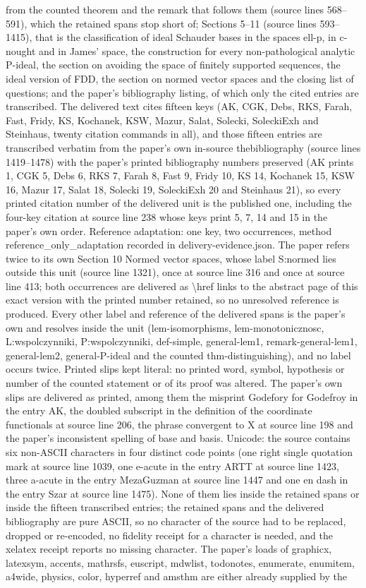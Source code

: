 \documentclass[10pt,a4paper]{amsart}
\begin{document}
from the counted theorem and the remark that follows them (source lines 568--591), which the retained spans stop short of; Sections 5--11 (source lines 593--1415), that is the classification of ideal Schauder bases in the spaces ell-p, in c-nought and in James' space, the construction for every non-pathological analytic P-ideal, the section on avoiding the space of finitely supported sequences, the ideal version of FDD, the section on normed vector spaces and the closing list of questions; and the paper's bibliography listing, of which only the cited entries are transcribed. The delivered text cites fifteen keys (AK, CGK, Debs, RKS, Farah, Fast, Fridy, KS, Kochanek, KSW, Mazur, Salat, Solecki, SoleckiExh and Steinhaus, twenty citation commands in all), and those fifteen entries are transcribed verbatim from the paper's own in-source thebibliography (source lines 1419--1478) with the paper's printed bibliography numbers preserved (AK prints 1, CGK 5, Debs 6, RKS 7, Farah 8, Fast 9, Fridy 10, KS 14, Kochanek 15, KSW 16, Mazur 17, Salat 18, Solecki 19, SoleckiExh 20 and Steinhaus 21), so every printed citation number of the delivered unit is the published one, including the four-key citation at source line 238 whose keys print 5, 7, 14 and 15 in the paper's own order. Reference adaptation: one key, two occurrences, method reference\_only\_adaptation recorded in delivery-evidence.json. The paper refers twice to its own Section 10 Normed vector spaces, whose label S:normed lies outside this unit (source line 1321), once at source line 316 and once at source line 413; both occurrences are delivered as \textbackslash{}href links to the abstract page of this exact version with the printed number retained, so no unresolved reference is produced. Every other label and reference of the delivered spans is the paper's own and resolves inside the unit (lem-isomorphisms, lem-monotonicznosc, L:wspolczynniki, P:wspolczynniki, def-simple, general-lem1, remark-general-lem1, general-lem2, general-P-ideal and the counted thm-distinguishing), and no label occurs twice. Printed slips kept literal: no printed word, symbol, hypothesis or number of the counted statement or of its proof was altered. The paper's own slips are delivered as printed, among them the misprint Godefory for Godefroy in the entry AK, the doubled subscript in the definition of the coordinate functionals at source line 206, the phrase convergent to X at source line 198 and the paper's inconsistent spelling of base and basis. Unicode: the source contains six non-ASCII characters in four distinct code points (one right single quotation mark at source line 1039, one e-acute in the entry ARTT at source line 1423, three a-acute in the entry MezaGuzman at source line 1447 and one en dash in the entry Szar at source line 1475). None of them lies inside the retained spans or inside the fifteen transcribed entries; the retained spans and the delivered bibliography are pure ASCII, so no character of the source had to be replaced, dropped or re-encoded, no fidelity receipt for a character is needed, and the xelatex receipt reports no missing character. The paper's loads of graphicx, latexsym, accents, mathrsfs, euscript, mdwlist, todonotes, enumerate, enumitem, a4wide, physics, color, hyperref and amsthm are either already supplied by the 
\end{document}
